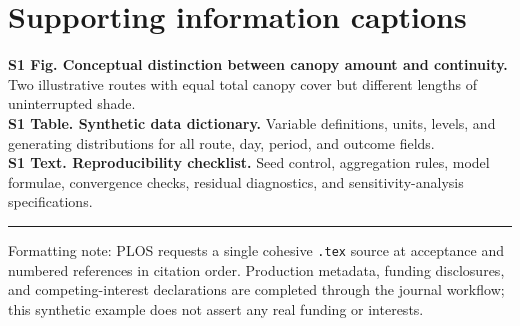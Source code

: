 \section*{Supporting information captions}
\textbf{S1 Fig. Conceptual distinction between canopy amount and continuity.} Two illustrative routes with equal total canopy cover but different lengths of uninterrupted shade.\\
\textbf{S1 Table. Synthetic data dictionary.} Variable definitions, units, levels, and generating distributions for all route, day, period, and outcome fields.\\
\textbf{S1 Text. Reproducibility checklist.} Seed control, aggregation rules, model formulae, convergence checks, residual diagnostics, and sensitivity-analysis specifications.

\vspace{16pt}
{\color{Rule}\hrule}
\vspace{6pt}
{\footnotesize\color{Slate}\sffamily
Formatting note: PLOS requests a single cohesive \texttt{.tex} source at acceptance and numbered references in citation order. Production metadata, funding disclosures, and competing-interest declarations are completed through the journal workflow; this synthetic example does not assert any real funding or interests.}
